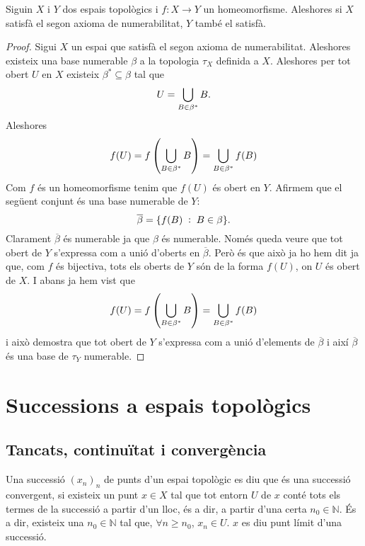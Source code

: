 \documentclass[../main.tex]{subfiles}
\begin{document}
\begin{ter}
\label{ter:2anhomeomorfisme} Siguin $X$ i $Y$ dos espais topològics i $f:X\rightarrow Y$ un homeomorfisme. Aleshores si $X$ satisfà el segon axioma de numerabilitat, $Y$ també el satisfà.
\end{ter}
\begin{proof}
Sigui $X$ un espai que satisfà el segon axioma de numerabilitat. Aleshores existeix una base numerable $\beta$ a la topologia $\tau_X$ definida a $X$. Aleshores per tot obert $U$ en $X$ existeix $\beta^*\subseteq \beta$ tal que
\begin{equation}
    \notag
    U = \bigcup_{B\in\beta^*}B.
\end{equation}
Aleshores
\begin{equation}
    \notag
    f(U) = f\left(\bigcup_{B\in\beta^*}B\right) = \bigcup_{B\in\beta^*}f(B)
\end{equation}
Com $f$ és un homeomorfisme tenim que $f(U)$ és obert en $Y$. Afirmem que el següent conjunt és una base numerable de $Y$:
\begin{equation}
    \notag
    \overline{\beta} = \{f(B)\;:\;B\in\beta\} .
\end{equation}
Clarament $\overline{\beta}$ és numerable ja que $\beta$ és numerable. Només queda veure que tot obert de $Y$ s'expressa com a unió d'oberts en $\overline{\beta}$. Però és que això ja ho hem dit ja que, com $f$ és bijectiva, tots els oberts de $Y$ són de la forma $f(U)$, on $U$ és obert de $X$. I abans ja hem vist que 
\begin{equation}
    \notag
    f(U) = f\left(\bigcup_{B\in\beta^*}B\right) = \bigcup_{B\in\beta^*}f(B)
\end{equation}
i això demostra que tot obert de $Y$ s'expressa com a unió d'elements de $\overline{\beta}$ i així $\overline{\beta}$ és una base de $\tau_Y$ numerable.
\end{proof}


\section{Successions a espais topològics}

\subsection{Tancats, continuïtat i convergència}
\begin{defi}
\label{def:successioconvergentesptopo} Una successió $(x_n)_n$ de punts d'un espai topològic es diu que és una successió convergent, si existeix un punt $x\in X$ tal que tot entorn $U$ de $x$ conté tots els termes de la successió a partir d'un lloc, és a dir, a partir d'una certa $n_0\in\mathbb{N}$. És a dir, existeix una $n_0\in\mathbb{N}$ tal que, $\forall n\geq n_0$, $x_n\in U$. $x$ es diu punt límit d'una successió.
\end{defi}
\end{document}
